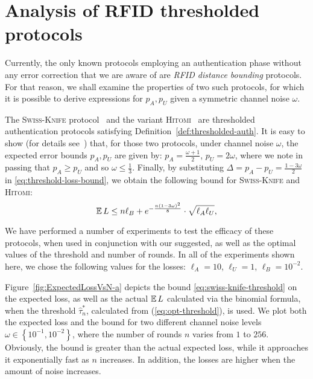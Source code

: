 \documentclass[a4paper]{article}
\newcommand\E{\mathop{\mbox{\ensuremath{\mathbb{E}}}}\nolimits}
\newcommand \thr {\tau}
\newcommand \hthr {\hat{\thr}_n^*}
\newcommand \noise {\omega}
\newcommand \loss {L}
\newcommand \pa {p_A}
\newcommand \pu {p_U}
\newcommand \LA {\ell_A}
\newcommand \LU {\ell_U}
\newcommand \LB {\ell_B}
\newcommand\set[1] {\left\{#1\right\}}
\newcommand \Swiss {\textsc{Swiss-Knife}}
\newcommand \Hitomi {\textsc{Hitomi}}
\theoremstyle{plain} \newtheorem{remark}{Remark}
\theoremstyle{plain} \newtheorem{definition}{Definition}
\theoremstyle{plain} \newtheorem{example}{Example}
\theoremstyle{plain} \newtheorem{assumption}{Assumption}
\theoremstyle{plain} \newtheorem{conjecture}{Conjecture}
\theoremstyle{plain} \newtheorem{theorem}{Theorem}
\theoremstyle{plain} \newtheorem{proposition}{Proposition}
\theoremstyle{plain} \newtheorem{lemma}{Lemma}
\theoremstyle{plain} \newtheorem{corollary}{Corollary}
\begin{document}
\section{Analysis of RFID thresholded protocols}
\label{sec:specific-protocols}

Currently, the only known protocols employing an authentication
phase without any error correction that we are aware of are {\em RFID
  distance bounding} protocols. For that reason, we shall examine the
properties of two such protocols, for which it is possible to derive
expressions for $\pa, \pu$ given a symmetric channel noise $\omega$.

The {\Swiss} protocol~\cite{KimAKSP-2008-icisc} and the
variant {\Hitomi}~\cite{sheddingLight}
are thresholded authentication protocols satisfying
Definition~\ref{def:thresholded-auth}.  It is easy to show (for
details see~\cite{sheddingLight}) that, for those two protocols, under
channel noise $\noise$, the expected error bounds $\pa, \pu$ are given
by: $\pa = \frac {\noise+1} {2}$, $\pu =2 \noise$, where we note in
passing that $\pa \geq \pu$ and so $\noise \leq \frac {1} {3}$.
Finally, by substituting $\Delta = \pa - \pu= \frac{1-3 \noise} {2}$
in \eqref{eq:threshold-loss-bound}, we obtain the following bound for
{\Swiss} and {\Hitomi}:
\begin{equation}
  \E \loss \leq n\LB + e^{-\frac{n(1-3\noise)^{2}}{8}} \cdot \sqrt{\LA\LU},
  \label{eq:swiss-knife-threshold}
\end{equation}

We have performed a number of experiments to test the efficacy of
these protocols, when used in conjunction with our suggested, as well
as the optimal values of the threshold and number of rounds.  In all
of the experiments shown here, we chose the following values for the
losses: $\LA = 10$, $\LU = 1$, $\LB = 10^{-2}$.  

Figure~\ref{fig:ExpectedLossVsN-a} depicts the bound
\eqref{eq:swiss-knife-threshold} on the expected loss, as well as the
actual $\E \loss$ calculated via the binomial formula, when the
threshold $\hthr$, calculated from (\ref{eq:opt-threshold}), is used.
We plot both the expected loss and the bound for two different channel
noise levels $\noise \in \set{10^{-1}, 10^{-2}}$, where the number of
rounds $n$ varies from $1$ to $256$. Obviously, the bound is greater
than the actual expected loss, while it approaches it exponentially
fast as $n$ increases.  In addition, the losses are higher when the
amount of noise increases.
\end{document}
